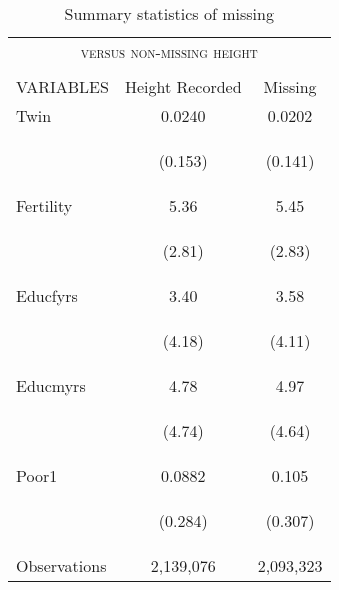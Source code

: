 \documentclass{article}[11pt,subeqn]
\begin{document}
\begin{spacing}{1.25}
\begin{table}[ht]
\caption{Summary statistics of missing}
\label{tab:missing}
\vspace{-7mm}
\begin{center}
\begin{tabular}{lcc} 
\multicolumn{3}{c}{\textsc{versus non-missing height}}\\
& & \\
\toprule
 VARIABLES & Height Recorded & Missing \\ \midrule
Twin & 0.0240 & 0.0202 \\
\begin{footnotesize}\end{footnotesize} & \begin{footnotesize}(0.153)\end{footnotesize} & \begin{footnotesize}(0.141)\end{footnotesize} \\
Fertility &  5.36 & 5.45\\
\begin{footnotesize}\end{footnotesize} & \begin{footnotesize}(2.81)\end{footnotesize} & \begin{footnotesize}(2.83)\end{footnotesize} \\
Educfyrs & 3.40 & 3.58\\
\begin{footnotesize}\end{footnotesize} & \begin{footnotesize}(4.18)\end{footnotesize} & \begin{footnotesize}(4.11)\end{footnotesize} \\
Educmyrs &  4.78 &  4.97 \\
\begin{footnotesize}\end{footnotesize} & \begin{footnotesize}(4.74)\end{footnotesize} & \begin{footnotesize}(4.64)\end{footnotesize} \\
Poor1 & 0.0882 & 0.105\\
\begin{footnotesize}\end{footnotesize} & \begin{footnotesize}(0.284)\end{footnotesize} & \begin{footnotesize}(0.307)\end{footnotesize} \\ \midrule
Observations & 2,139,076 &  2,093,323  \\ \bottomrule
\end{tabular}
\end{center}
\end{table}


\end{spacing}
\end{document}
